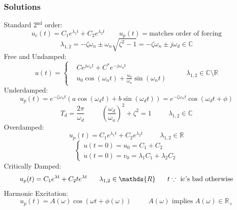 \documentclass[twocolumn, 12pt]{article}    %
\begin{document}
\subsubsection*{Solutions}
Standard 2\(^\text{nd}\) order:
\begin{equation*}
    u_c(t) = C_1e^{\lambda_1 t} + C_2e^{\lambda_2 t} \hspace{25pt} u_p(t) = \text{matches order of forcing}
\end{equation*}
\begin{equation*}
    \lambda_{1,2} = -\zeta \omega_n \pm \omega_n\sqrt{\zeta^2-1} = -\zeta\omega_n \pm j\omega_d \in \mathds{C}
\end{equation*}
Free and Undamped:
\[ u(t) = \begin{cases}
        &Ce^{j\omega_n t}+C^*e^{-j\omega_n t}\\
        &u_0\cos(\omega_n t) +\frac{\dot{u}_0}{\omega_n}\sin(\omega_n t)
 \end{cases}
 \hspace{30pt} \lambda_{1,2} \in \mathds{C} \setminus \mathds{R}
\]
Underdamped:
\begin{equation*}
    u_p(t) = e^{-\zeta\omega_n t} \left(a\cos(\omega_d t) +b\sin(\omega_d t) \right) = e^{-\zeta\omega_n t}\cos(\omega_d t +\phi)
\end{equation*}
\begin{equation*}
    T_d =\frac{2\pi}{\omega_d} \hspace{30pt} \left(\frac{\omega_d}{\omega_n}\right)^2 + \zeta^2 = 1 \hspace{30pt} \lambda_{1,2} \in \mathds{C}
\end{equation*}
Overdamped:
\begin{equation*}
    u_p(t) = C_1e^{\lambda_1 t} + C_2e^{\lambda_2 t} \hspace{30pt} \lambda_{1,2} \in \mathds{R} 
\end{equation*}
\[
\begin{cases}
    u(t=0) = u_0 = C_1 + C_2\\
    \Dot{u}(t=0) = v_0 =\lambda_1 C_1 + \lambda_2 C_2
\end{cases}
\]
Critically Damped:
\begin{equation*}
    u_p(t) = C_1 e^{\lambda t } + C_2 te^{\lambda t} \hspace{17.5pt} \lambda_{1,2}\in \mathds{R} \hspace{17.5pt} t \because \text{ ic's bad otherwise}
\end{equation*}
Harmonic Excitation:
\begin{equation*}
    u_p(t) = A(\omega) \cos(\omega t + \phi(\omega)) \hspace{30pt} A(\omega) \text{ implies } A(\omega) \in \mathds{R}_+
\end{equation*}
\end{document}
